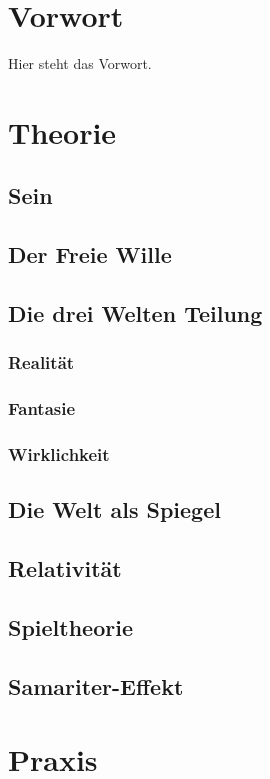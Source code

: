 
\part{Vorwort}
Hier steht das Vorwort.
\part{Theorie}

\chapter{Sein}
\chapter{Der Freie Wille}
\chapter{Die drei Welten Teilung}
\section{Realität}
\section{Fantasie}
\section{Wirklichkeit}
\chapter{Die Welt als Spiegel}
\chapter{Relativität}
\chapter{Spieltheorie}
\chapter{Samariter-Effekt}
\part{Praxis}

